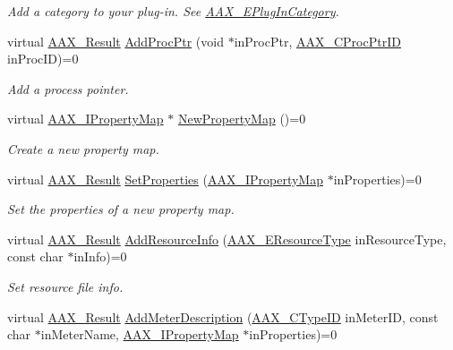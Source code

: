 \begin{DoxyCompactItemize}
\begin{DoxyCompactList}\small\item\em Add a category to your plug-\/in. See \hyperlink{a00206_aef9637518fb1ac0e2f403444c73aba4a}{A\+A\+X\+\_\+\+E\+Plug\+In\+Category}. \end{DoxyCompactList}\item 
virtual \hyperlink{a00149_a4d8f69a697df7f70c3a8e9b8ee130d2f}{A\+A\+X\+\_\+\+Result} \hyperlink{a00096_ad1a286ef7cb869e6f79423dd774ec976}{Add\+Proc\+Ptr} (void $\ast$in\+Proc\+Ptr, \hyperlink{a00163_af0682195d377392ad356fd2b00c36892}{A\+A\+X\+\_\+\+C\+Proc\+Ptr\+I\+D} in\+Proc\+I\+D)=0
\begin{DoxyCompactList}\small\item\em Add a process pointer. \end{DoxyCompactList}\item 
virtual \hyperlink{a00112}{A\+A\+X\+\_\+\+I\+Property\+Map} $\ast$ \hyperlink{a00096_ac90c1b595d65259f798429474bbe926f}{New\+Property\+Map} ()=0
\begin{DoxyCompactList}\small\item\em Create a new property map. \end{DoxyCompactList}\item 
virtual \hyperlink{a00149_a4d8f69a697df7f70c3a8e9b8ee130d2f}{A\+A\+X\+\_\+\+Result} \hyperlink{a00096_ac57ed8597814db525eb69a2d2bfd9d87}{Set\+Properties} (\hyperlink{a00112}{A\+A\+X\+\_\+\+I\+Property\+Map} $\ast$in\+Properties)=0
\begin{DoxyCompactList}\small\item\em Set the properties of a new property map. \end{DoxyCompactList}\item 
virtual \hyperlink{a00149_a4d8f69a697df7f70c3a8e9b8ee130d2f}{A\+A\+X\+\_\+\+Result} \hyperlink{a00096_a3326bd8e29690a352408539029a50a61}{Add\+Resource\+Info} (\hyperlink{a00206_ae2805e88175d975589153a04e42898bb}{A\+A\+X\+\_\+\+E\+Resource\+Type} in\+Resource\+Type, const char $\ast$in\+Info)=0
\begin{DoxyCompactList}\small\item\em Set resource file info. \end{DoxyCompactList}\item 
virtual \hyperlink{a00149_a4d8f69a697df7f70c3a8e9b8ee130d2f}{A\+A\+X\+\_\+\+Result} \hyperlink{a00096_a7b89727b793c1b57a3815e59868c2713}{Add\+Meter\+Description} (\hyperlink{a00149_ac678f9c1fbcc26315d209f71a147a175}{A\+A\+X\+\_\+\+C\+Type\+I\+D} in\+Meter\+I\+D, const char $\ast$in\+Meter\+Name, \hyperlink{a00112}{A\+A\+X\+\_\+\+I\+Property\+Map} $\ast$in\+Properties)=0

\end{DoxyCompactItemize}

